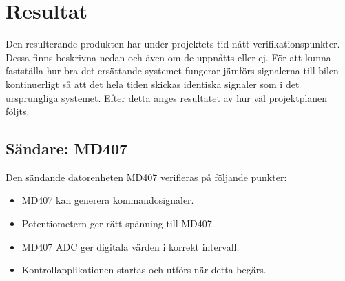 \documentclass[a4paper]{article}
\begin{document}





\newpage
\section{Resultat}
Den resulterande produkten har under projektets tid nått verifikationspunkter. Dessa finns beskrivna nedan och även om de uppnåtts eller ej. För att kunna fastställa hur bra det ersättande systemet fungerar jämförs signalerna till bilen kontinuerligt så att det hela tiden skickas identiska signaler som i det ursprungliga systemet. Efter detta anges resultatet av hur väl projektplanen följts.


\subsection{Sändare: MD407}
Den sändande datorenheten MD407 verifieras på följande punkter:
\begin{itemize}
\item MD407 kan generera kommandosignaler.
\item Potentiometern ger rätt spänning till MD407.
\item MD407 ADC ger digitala värden i korrekt intervall.
\item Kontrollapplikationen startas och utförs när detta begärs.
\end{itemize}
\end{document}
